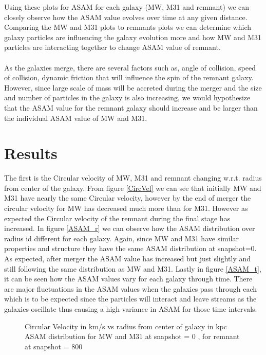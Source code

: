 \documentclass[twocolumn]{aastex631}
\begin{document}
Using these plots for ASAM for each galaxy (MW, M31 and remnant) we can closely observe how the ASAM value evolves over time at any given distance. Comparing the MW and M31 plots to remnants plots we can determine which galaxy particles are influencing the galaxy evolution more and how MW and M31 particles are interacting together to change ASAM value of remnant.
\\\\
As the galaxies merge, there are several factors such as, angle of collision, speed of collision, dynamic friction that will influence the spin of the remnant galaxy. However, since large scale of mass will be accreted during the merger and the size and number of particles in the galaxy is also increasing, we would hypothesize that the ASAM value for the remnant galaxy should increase and be larger than the individual ASAM value of MW and M31.

\section{Results} \label{sec:results}
The first is the Circular velocity of MW, M31 and remnant changing w.r.t. radius from center of the galaxy. From figure \ref{CircVel} we can see that initially MW and M31 have nearly the same Circular velocity, however by the end of merger the circular velocity for MW has decreased much more than for M31. However as expected the Circular velocity of the remnant during the final stage has increased.
In figure \ref{ASAM_r} we can observe how the ASAM distribution over radius id different for each galaxy. Again, since MW and M31 have similar properties and structure they have the same ASAM distribution at snapshot=0. As expected, after merger the ASAM value has increased but just slightly and still following the same distribution as MW and M31.
Lastly in figure \ref{ASAM_t}, it can be seen how the ASAM values vary for each galaxy through time. There are major fluctuations in the ASAM values when the galaxies pass through each which is to be expected since the particles will interact and leave streams as the galaxies oscillate thus causing a high variance in ASAM for those time intervals.

\begin{figure}[H]\label{CircVel}
\caption {Circular Velocity in km/s vs radius from center of galaxy in kpc
ASAM distribution for MW and M31 at snapshot = 0 , for remnant at snapshot = 800}
\label{fig:ang_p}
\end{figure}
\end{document}
